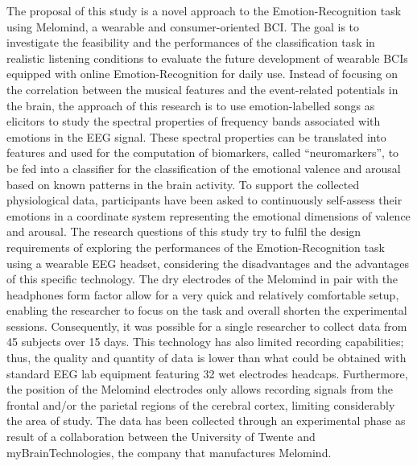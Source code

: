 The proposal of this study is a novel approach to the Emotion-Recognition task using Melomind, a wearable and consumer-oriented BCI. The goal is to investigate the feasibility and the performances of the classification task in realistic listening conditions to evaluate the future development of wearable BCIs equipped with online Emotion-Recognition for daily use. Instead of focusing on the correlation between the musical features and the event-related potentials in the brain, the approach of this research is to use emotion-labelled songs as elicitors to study the spectral properties of frequency bands associated with emotions in the EEG signal. These spectral properties can be translated into features and used for the computation of biomarkers, called “neuromarkers”, to be fed into a classifier for the classification of the emotional valence and arousal based on known patterns in the brain activity. To support the collected physiological data, participants have been asked to continuously self-assess their emotions in a coordinate system representing the emotional dimensions of valence and arousal. The research questions of this study try to fulfil the design requirements of exploring the performances of the Emotion-Recognition task using a wearable EEG headset, considering the disadvantages and the advantages of this specific technology. The dry electrodes of the Melomind in pair with the headphones form factor allow for a very quick and relatively comfortable setup, enabling the researcher to focus on the task and overall shorten the experimental sessions. Consequently, it was possible for a single researcher to collect data from 45 subjects over 15 days. This technology has also limited recording capabilities; thus, the quality and quantity of data is lower than what could be obtained with standard EEG lab equipment featuring 32 wet electrodes headcaps. Furthermore, the position of the Melomind electrodes only allows recording signals from the frontal and/or the parietal regions of the cerebral cortex, limiting considerably the area of study. The data has been collected through an experimental phase as result of a collaboration between the University of Twente and myBrainTechnologies, the company that manufactures Melomind.


